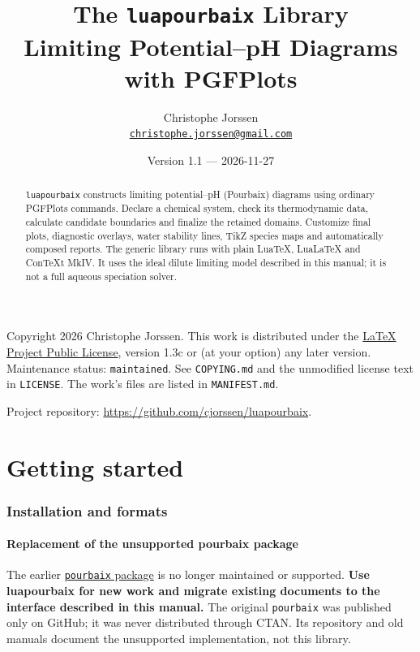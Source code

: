 \documentclass[a4paper,11pt]{ltxdoc}
\title{The \texttt{luapourbaix} Library\\
  \large Limiting Potential--pH Diagrams with PGFPlots}
\author{Christophe Jorssen\\
 \href{mailto:christophe.jorssen@gmail.com}{\texttt{christophe.jorssen@gmail.com}}}
\date{Version 1.1 --- 2026-11-27}
\begin{document}
\maketitle
\begin{abstract}
\texttt{luapourbaix} constructs limiting potential--pH (Pourbaix) diagrams
using ordinary PGFPlots commands. Declare a chemical system, check its
thermodynamic data, calculate candidate boundaries and finalize the retained
domains. Customize final plots, diagnostic overlays, water stability lines,
TikZ species maps and automatically composed reports. The generic library runs
with plain LuaTeX, LuaLaTeX and ConTeXt MkIV. It uses the ideal dilute limiting
model described in this manual; it is not a full aqueous speciation solver.
\end{abstract}
\begin{center}
\end{center}
\noindent Copyright 2026 Christophe Jorssen. This work is distributed under the
\href{https://www.latex-project.org/lppl/}{LaTeX Project Public License},
version 1.3c or (at your option) any later version. Maintenance status:
\texttt{maintained}. See \texttt{COPYING.md} and the unmodified license text in
\texttt{LICENSE}. The work's files are listed in \texttt{MANIFEST.md}.

\noindent Project repository:
\url{https://github.com/cjorssen/luapourbaix}.


\tableofcontents
\clearpage


\part{Getting started}
\section{Installation and formats}
\subsection{Replacement of the unsupported pourbaix package}
The earlier \href{https://github.com/cjorssen/pourbaix}{\texttt{pourbaix} package}
is no longer maintained or supported. \textbf{Use luapourbaix for new work and
migrate existing documents to the interface described in this manual.}
The original \texttt{pourbaix} was published only on GitHub; it was never
distributed through CTAN. Its repository and old manuals document the unsupported
implementation, not this library.
\end{document}
